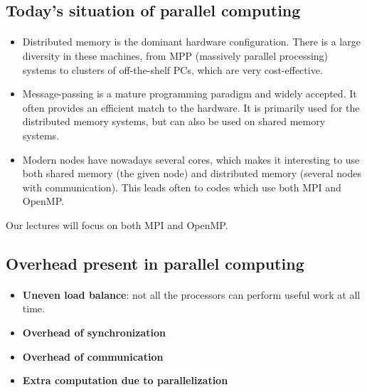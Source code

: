 \documentclass[%
twoside,                 %
final,                   %
10pt]{article}
\begin{document}
\noindent


\subsection{Today's situation of parallel computing}

\paragraph{}

\begin{itemize}
\item Distributed memory is the dominant hardware configuration. There is a large diversity in these machines, from  MPP (massively parallel processing) systems to clusters of off-the-shelf PCs, which are very cost-effective.

\item Message-passing is a mature programming paradigm and widely accepted. It often provides an efficient match to the hardware. It is primarily used for the distributed memory systems, but can also be used on shared memory systems.

\item Modern nodes have nowadays several cores, which makes it interesting to use both shared memory (the given node) and distributed memory (several nodes with communication). This leads often to codes which use both MPI and OpenMP.
\end{itemize}

\noindent
Our lectures will focus on both MPI and OpenMP.



\subsection{Overhead present in parallel computing}

\paragraph{}

\begin{itemize}
\item \textbf{Uneven load balance}:  not all the processors can perform useful work at all time.

\item \textbf{Overhead of synchronization}

\item \textbf{Overhead of communication}

\item \textbf{Extra computation due to parallelization}
\end{itemize}
\end{document}
